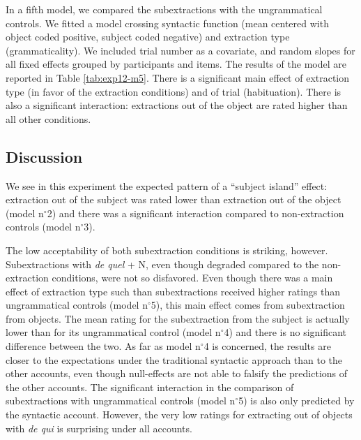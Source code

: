

In a fifth model, we compared the subextractions with the ungrammatical controls. We fitted a model crossing syntactic function (mean centered with object coded positive, subject coded negative) and extraction type (grammaticality). We included trial number as a covariate, and random slopes for all fixed effects grouped by participants and items. The results of the model are reported in Table \ref{tab:exp12-m5}. 
There is a significant main effect of extraction type (in favor of the extraction conditions) and of trial (habituation). There is also a significant interaction: extractions out of the object are rated higher than all other conditions.



\subsection{Discussion}

We see in this experiment the expected pattern of a ``subject island'' effect: extraction out of the subject was rated lower than extraction out of the object (model n$^{\circ}$2) and there was a significant interaction compared to non-extraction controls (model n$^{\circ}$3). 

The low acceptability of both subextraction conditions is striking, however. Subextractions with \emph{de quel} + N, even though degraded compared to the non-extraction conditions, were not so disfavored. Even though there was a main effect of extraction type such than subextractions received higher ratings than ungrammatical controls (model n$^{\circ}$5), this main effect comes from subextraction from objects. The mean rating for the subextraction from the subject is actually lower than for its ungrammatical control (model n$^{\circ}$4) and there is no significant difference between the two.
As far as model n$^{\circ}$4 is concerned, the results are closer to the expectations under the traditional syntactic approach than to the other accounts, even though null-effects are not able to falsify the predictions of the other accounts. The significant interaction in the comparison of subextractions with ungrammatical controls (model n$^{\circ}$5) is also only predicted by the syntactic account. However, the very low ratings for extracting out of objects with \emph{de qui} is surprising under all accounts.


